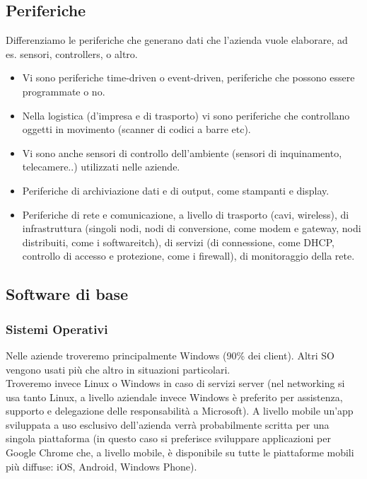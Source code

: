 \subsection{Periferiche}
Differenziamo le periferiche che generano dati che l'azienda vuole elaborare, ad es. sensori, controllers, o altro.
\begin{itemize}
  \item Vi sono periferiche time-driven o event-driven, periferiche che possono essere programmate o no.
  \item Nella logistica (d'impresa e di trasporto) vi sono periferiche che controllano oggetti in movimento (scanner di codici a barre etc).
  \item Vi sono anche sensori di controllo dell'ambiente (sensori di inquinamento, telecamere..) utilizzati nelle aziende.
  \item Periferiche di archiviazione dati e di output, come stampanti e display.
  \item Periferiche di rete e comunicazione, a livello di trasporto (cavi, wireless), di infrastruttura (singoli nodi, nodi di conversione, come modem e gateway, nodi distribuiti, come i softwareitch), di servizi (di connessione, come DHCP, controllo di accesso e protezione, come i firewall), di monitoraggio della rete.
\end{itemize}

\subsection{Software di base}
\subsubsection{Sistemi Operativi}
Nelle aziende troveremo principalmente Windows (90\% dei client). Altri SO vengono usati
pi\`u che altro in situazioni particolari. \\
Troveremo invece Linux o Windows in caso di servizi server (nel networking si usa tanto Linux, a livello
aziendale invece Windows \`e preferito per assistenza, supporto e delegazione delle responsabilit\`a a Microsoft).
A livello mobile un'app sviluppata a uso esclusivo dell'azienda verr\`a probabilmente scritta per una singola piattaforma (in questo caso si preferisce sviluppare applicazioni per Google Chrome che, a livello mobile, \`e disponibile su tutte le piattaforme mobili pi\`u diffuse: iOS, Android, Windows Phone).
